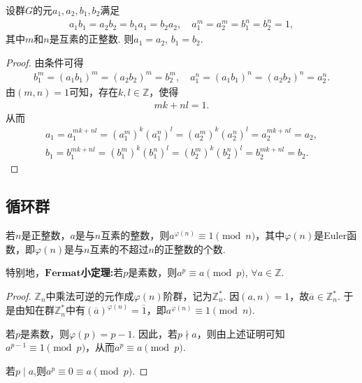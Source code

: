 \documentclass[../../main.tex]{subfiles}%
\begin{document}
\begin{example}
设群$G$的元$a_1, a_2, b_1, b_2$满足
\begin{align*}
a_1b_1 = a_2b_2 = b_1a_1 = b_2a_2,\quad a_1^m = a_2^m = b_1^n = b_2^n = 1,
\end{align*}
其中$m$和$n$是互素的正整数. 则$a_1 = a_2$, $b_1 = b_2$.
\end{example}
\begin{proof}

由条件可得
\begin{align*}
b_1^m=(a_1b_1)^m=(a_2b_2)^m=b_2^m,\quad a_1^n=(a_1b_1)^n=(a_2b_2)^n=a_2^n.
\end{align*}
由$(m,n)=1$可知，存在$k,l\in\mathbb{Z}$，使得
\begin{align*}
mk+nl=1.
\end{align*}
从而
\begin{align*}
a_1=a_1^{mk+nl}=(a_1^m)^k(a_1^n)^l=(a_2^m)^k(a_2^n)^l=a_2^{mk+nl}=a_2,\\
b_1=b_1^{mk+nl}=(b_1^m)^k(b_1^n)^l=(b_2^m)^k(b_2^n)^l=b_2^{mk+nl}=b_2.
\end{align*}

\end{proof}

\subsection{循环群}

\begin{theorem}[Euler定理]\label{theorem:Euler定理}
若$n$是正整数，$a$是与$n$互素的整数，则$a^{\varphi(n)} \equiv 1 \pmod{n}$，其中$\varphi(n)$是Euler函数，即$\varphi(n)$是与$n$互素的不超过$n$的正整数的个数.

特别地，$\mathbf{Fermat}$\textbf{小定理:}若$p$是素数，则$a^p \equiv a \pmod{p}$, $\forall a \in \mathbb{Z}$.
\end{theorem}
\begin{proof}

$\mathbb{Z}_n$中乘法可逆的元作成$\varphi(n)$阶群，记为$\mathbb{Z}_n^*$. 因$(a,n)=1$，故$\overline{a} \in \mathbb{Z}_n^*$. 于是由知在群$\mathbb{Z}_n^*$中有$(\overline{a})^{\varphi(n)} = \overline{1}$，即$a^{\varphi(n)} \equiv 1 \pmod{n}$.

若$p$是素数，则$\varphi(p)=p-1$. 因此，若$p \nmid a$，则由上述证明可知$a^{p-1} \equiv 1 \pmod{p}$，从而$a^p \equiv a \pmod{p}$. 

若$p \mid a$,则$a^p\equiv 0\equiv a\pmod{p}$.

\end{proof}
\end{document}
